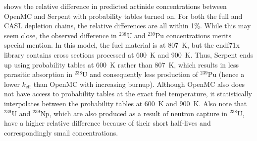 \documentclass[3p,authoryear]{elsarticle}
\begin{document}
 shows the relative difference in predicted actinide
concentrations between OpenMC and Serpent with probability tables turned on. For
both the full and CASL depletion chains, the relative differences are all within
1\%. While this may seem close, the observed difference in $^{238}$U and
$^{239}$Pu concentrations merits special mention. In this model, the fuel
material is at \SI{807}{\kelvin}, but the endf71x library contains cross
sections processed at \SI{600}{\kelvin} and \SI{900}{\kelvin}. Thus, Serpent
ends up using probability tables at \SI{600}{\kelvin} rather than
\SI{807}{\kelvin}, which results in less parasitic absorption in $^{238}$U and
consequently less production of $^{239}$Pu (hence a lower $k_\text{eff}$ than
OpenMC with increasing burnup). Although OpenMC also does not have access to
probability tables at the exact fuel temperature, it statistically interpolates
between the probability tables at \SI{600}{\kelvin} and \SI{900}{\kelvin}. Also
note that $^{239}$U and $^{239}$Np, which are also produced as a result of
neutron capture in $^{238}$U, have a higher relative difference because of their
short half-lives and correspondingly small concentrations.
\end{document}
